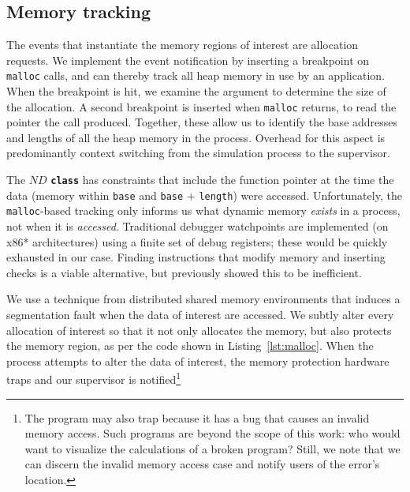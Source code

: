 \subsection{Memory tracking}

The events that instantiate the memory regions of interest are
allocation requests.  We implement the event notification by
inserting a breakpoint on \texttt{malloc} calls, and can thereby track
all heap memory in use by an application.  When the breakpoint is hit,
we examine the argument to determine the size of the allocation.  A
second breakpoint is inserted when
\texttt{malloc} returns, to read the pointer the call produced.
Together, these allow us to identify the base addresses and lengths
of all the heap memory in the process.  Overhead for this aspect is
predominantly context switching from the simulation process to the
supervisor.

The $ND$ \texttt{\textbf{class}} has constraints that include the
function pointer at the time the data (memory within \texttt{base} and
\texttt{base} $+$ \texttt{length}) were accessed.  Unfortunately, the
\texttt{malloc}-based tracking only informs us what dynamic memory
\emph{exists} in a process, not when it is \emph{accessed}.
Traditional debugger watchpoints are implemented (on x86*
architectures) using a finite set of debug registers; these would be
quickly exhausted in our case.  Finding instructions that modify memory
and inserting checks is a viable
alternative, but \cite{Antoniu:2001:PFault} previously showed this to
be inefficient.


We use a technique from distributed shared memory environments that
induces a segmentation fault when the data of interest are accessed.
We subtly alter every allocation of interest so that it not only
allocates the memory, but also protects the memory region, as per the code
shown in Listing~\ref{lst:malloc}.  When the process attempts to alter
the data of interest, the memory
protection hardware traps and our supervisor is notified\footnote{The
program may also trap because it has a bug that causes an invalid
memory access.  Such programs are beyond the scope of this work: who
would want to visualize the calculations of a broken program?  Still,
we note that we can discern the invalid memory access case and notify
users of the error's location.}

